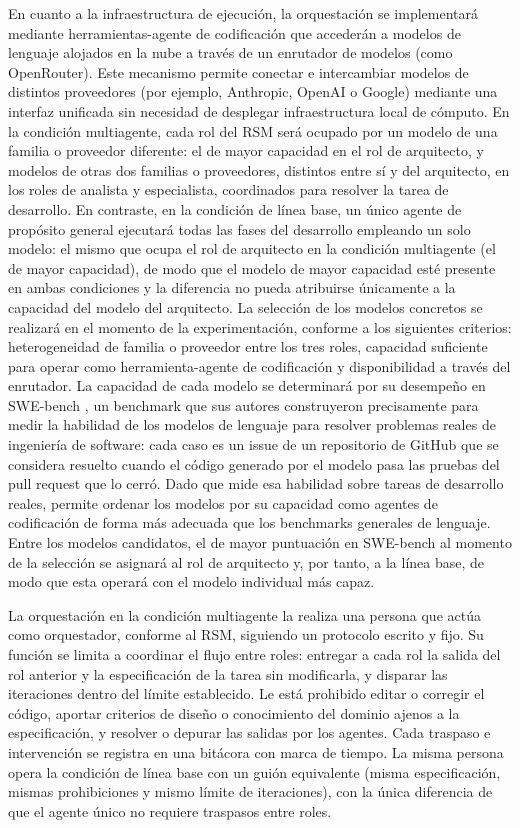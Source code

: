 En cuanto a la infraestructura de ejecución, la orquestación se implementará mediante herramientas-agente de codificación que accederán a modelos de lenguaje alojados en la nube a través de un enrutador de modelos (como OpenRouter). Este mecanismo permite conectar e intercambiar modelos de distintos proveedores (por ejemplo, Anthropic, OpenAI o Google) mediante una interfaz unificada sin necesidad de desplegar infraestructura local de cómputo. En la condición multiagente, cada rol del RSM será ocupado por un modelo de una familia o proveedor diferente: el de mayor capacidad en el rol de arquitecto, y modelos de otras dos familias o proveedores, distintos entre sí y del arquitecto, en los roles de analista y especialista, coordinados para resolver la tarea de desarrollo. En contraste, en la condición de línea base, un único agente de propósito general ejecutará todas las fases del desarrollo empleando un solo modelo: el mismo que ocupa el rol de arquitecto en la condición multiagente (el de mayor capacidad), de modo que el modelo de mayor capacidad esté presente en ambas condiciones y la diferencia no pueda atribuirse únicamente a la capacidad del modelo del arquitecto. La selección de los modelos concretos se realizará en el momento de la experimentación, conforme a los siguientes criterios: heterogeneidad de familia o proveedor entre los tres roles, capacidad suficiente para operar como herramienta-agente de codificación y disponibilidad a través del enrutador. La capacidad de cada modelo se determinará por su desempeño en SWE-bench \parencite{jimenez2024swebench}, un benchmark que sus autores construyeron precisamente para medir la habilidad de los modelos de lenguaje para resolver problemas reales de ingeniería de software: cada caso es un issue de un repositorio de GitHub que se considera resuelto cuando el código generado por el modelo pasa las pruebas del pull request que lo cerró. Dado que mide esa habilidad sobre tareas de desarrollo reales, permite ordenar los modelos por su capacidad como agentes de codificación de forma más adecuada que los benchmarks generales de lenguaje. Entre los modelos candidatos, el de mayor puntuación en SWE-bench al momento de la selección se asignará al rol de arquitecto y, por tanto, a la línea base, de modo que esta operará con el modelo individual más capaz.

La orquestación en la condición multiagente la realiza una persona que actúa como orquestador, conforme al RSM, siguiendo un protocolo escrito y fijo. Su función se limita a coordinar el flujo entre roles: entregar a cada rol la salida del rol anterior y la especificación de la tarea sin modificarla, y disparar las iteraciones dentro del límite establecido. Le está prohibido editar o corregir el código, aportar criterios de diseño o conocimiento del dominio ajenos a la especificación, y resolver o depurar las salidas por los agentes. Cada traspaso e intervención se registra en una bitácora con marca de tiempo. La misma persona opera la condición de línea base con un guión equivalente (misma especificación, mismas prohibiciones y mismo límite de iteraciones), con la única diferencia de que el agente único no requiere traspasos entre roles.

